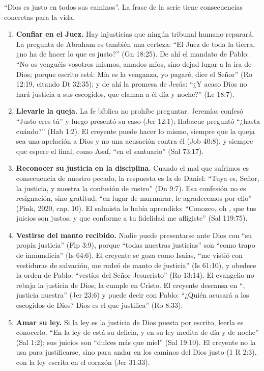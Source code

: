 ``Dios es justo en todos sus caminos''. La frase de la serie tiene consecuencias concretas para la vida.

\begin{enumerate}
\item \textbf{Confiar en el Juez.} Hay injusticias que ningún tribunal humano reparará. La pregunta de Abraham es también una certeza: ``El Juez de toda la tierra, ¿no ha de hacer lo que es justo?'' (Gn 18:25). De ahí el mandato de Pablo: ``No os venguéis vosotros mismos, amados míos, sino dejad lugar a la ira de Dios; porque escrito está: Mía es la venganza, yo pagaré, dice el Señor'' (Ro 12:19, citando Dt 32:35); y de ahí la promesa de Jesús: ``¿Y acaso Dios no hará justicia a sus escogidos, que claman a él día y noche?'' (Lc 18:7).

\item \textbf{Llevarle la queja.} La fe bíblica no prohíbe preguntar. Jeremías confesó ``Justo eres tú'' y luego presentó su caso (Jer 12:1); Habacuc preguntó ``¿hasta cuándo?'' (Hab 1:2). El creyente puede hacer lo mismo, siempre que la queja sea una apelación a Dios y no una acusación contra él (Job 40:8), y siempre que espere el final, como Asaf, ``en el santuario'' (Sal 73:17).

\item \textbf{Reconocer su justicia en la disciplina.} Cuando el mal que sufrimos es consecuencia de nuestro pecado, la respuesta es la de Daniel: ``Tuya es, Señor, la justicia, y nuestra la confusión de rostro'' (Dn 9:7). Esa confesión no es resignación, sino gratitud: ``en lugar de murmurar, le agradecemos por ello'' (Pink, 2020, cap. 10). El salmista lo había aprendido: ``Conozco, oh \SENOR, que tus juicios son justos, y que conforme a tu fidelidad me afligiste'' (Sal 119:75).

\item \textbf{Vestirse del manto recibido.} Nadie puede presentarse ante Dios con ``su propia justicia'' (Flp 3:9), porque ``todas nuestras justicias'' son ``como trapo de inmundicia'' (Is 64:6). El creyente se goza como Isaías, ``me vistió con vestiduras de salvación, me rodeó de manto de justicia'' (Is 61:10), y obedece la orden de Pablo: ``vestíos del Señor Jesucristo'' (Ro 13:14). El evangelio no rebaja la justicia de Dios; la cumple en Cristo. El creyente descansa en ``\SENOR, justicia nuestra'' (Jer 23:6) y puede decir con Pablo: ``¿Quién acusará a los escogidos de Dios? Dios es el que justifica'' (Ro 8:33).

\item \textbf{Amar su ley.} Si la ley es la justicia de Dios puesta por escrito, leerla es conocerlo. ``En la ley de \SENOR{} está su delicia, y en su ley medita de día y de noche'' (Sal 1:2); sus juicios son ``dulces más que miel'' (Sal 19:10). El creyente no la usa para justificarse, sino para andar en los caminos del Dios justo (1 R 2:3), con la ley escrita en el corazón (Jer 31:33).


\end{enumerate}
